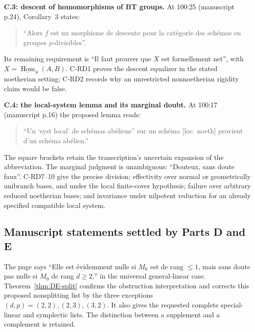 \par\smallskip\noindent\textbf{C.3: descent of homomorphisms of BT groups.}
At 100:25 (manuscript p.24), Corollary~3 states:
\begin{quote}
``Alors $f$ est un morphisme de descente pour la catégorie des
schémas en groupes $p$-divisibles''.
\end{quote}
Its remaining requirement is ``Il faut prouver que $X$ est
formellement net'', with $X=\underline{\operatorname{Hom}}_S(A,B)$.
C-RD1 proves the descent equalizer in the stated noetherian
setting; C-RD2 records why an unrestricted nonnoetherian rigidity
claim would be false.

\par\smallskip\noindent\textbf{C.4: the local-system lemma and its marginal doubt.}
At 100:17 (manuscript p.16) the proposed lemma reads:
\begin{quote}
``Un `syst local' de schémas abéliens'' sur un schéma [loc. noeth]
provient d'un schéma abélien.''
\end{quote}
The square brackets retain the transcription's uncertain expansion
of the abbreviation. The marginal judgment is unambiguous:
``Douteux, sans doute faux''. C-RD7--10 give the precise division:
effectivity over normal or geometrically unibranch bases, and under
the local finite-cover hypothesis; failure over arbitrary reduced
noetherian bases; and invariance under nilpotent reduction for an
already specified compatible local system.

\subsection{Manuscript statements settled by Parts D and E}

\begin{remark}\label{rem:DE-quote-D1}
The page says ``Elle est évidemment nulle si $M_0$ est de rang $\leq1$, mais sans doute pas nulle si $M_0$ de rang $d\geq2$,'' in the universal general-linear case.  Theorem~\ref{thm:DE-split} confirms the obstruction interpretation and corrects this proposed nonsplitting list by the three exceptions $(d,p)=(2,2),(2,3),(3,2)$.  It also gives the requested complete special-linear and symplectic lists.  The distinction between a supplement and a complement is retained.
\end{remark}

